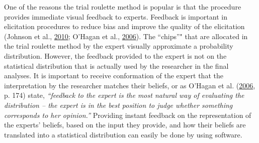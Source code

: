\documentclass[openright,titlepage,12pt,a4paper]{book}
\begin{document}
One of the reasons the trial roulette method is popular is that the procedure provides immediate visual feedback to experts. Feedback is important in elicitation procedures to reduce bias and improve the quality of the elicitation (Johnson et al., \protect\hyperlink{ref-johnson_methods_2010}{2010}; O'Hagan et al., \protect\hyperlink{ref-ohagan_uncertain_2006}{2006}). The ``chips''" that are allocated in the trial roulette method by the expert visually approximate a probability distribution. However, the feedback provided to the expert is not on the statistical distribution that is actually used by the researcher in the final analyses. It is important to receive conformation of the expert that the interpretation by the researcher matches their beliefs, or as O'Hagan et al. (\protect\hyperlink{ref-ohagan_uncertain_2006}{2006}, p. 174) state, \emph{``feedback to the expert is the most natural way of evaluating the distribution -- the expert is in the best position to judge whether something corresponds to her opinion.''} Providing instant feedback on the representation of the experts' beliefs, based on the input they provide, and how their beliefs are translated into a statistical distribution can easily be done by using software.
\end{document}
